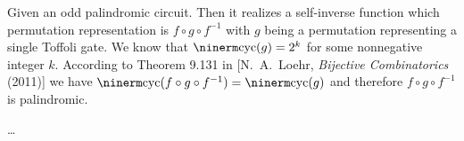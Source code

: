 \smallskip{} Given an odd palindromic circuit.  Then it
realizes a self-inverse function which permutation representation is $f\circ
g\circ f^{-1}$ with $g$ being a permutation representing a single Toffoli
gate. We know that ${\rm cyc}(g)=2^k$ for some nonnegative integer $k$.
According to Theorem 9.131 in [N.\ A.\ Loehr, {\sl Bijective Combinatorics\/}
(2011)] we have ${\rm cyc}(f\circ g\circ f^{-1}) = {\rm cyc}(g)$ and therefore
$f\circ g\circ f^{-1}$ is palindromic.

\dots \qquad\slug









